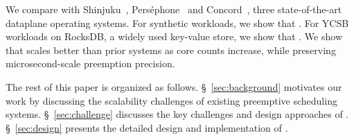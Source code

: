 We compare \sysname with Shinjuku~\cite{kaffes2019shinjuku}, Perséphone~\cite{demoulin2021idling} and Concord~\cite{iyer2023achieving}, three state-of-the-art dataplane operating systems.
For synthetic workloads, we show that .
For YCSB workloads on RocksDB, a widely used key-value store, we show that .
We show that \sysname scales better than prior systems as core counts increase, while preserving microsecond-scale preemption precision.

The rest of this paper is organized as follows.
\S~\ref{sec:background} motivates our work by discussing the scalability challenges of existing preemptive scheduling systems.
\S~\ref{sec:challenge} discusses the key challenges and design approaches of \sysname.
\S~\ref{sec:design} presents the detailed design and implementation of \sysname.